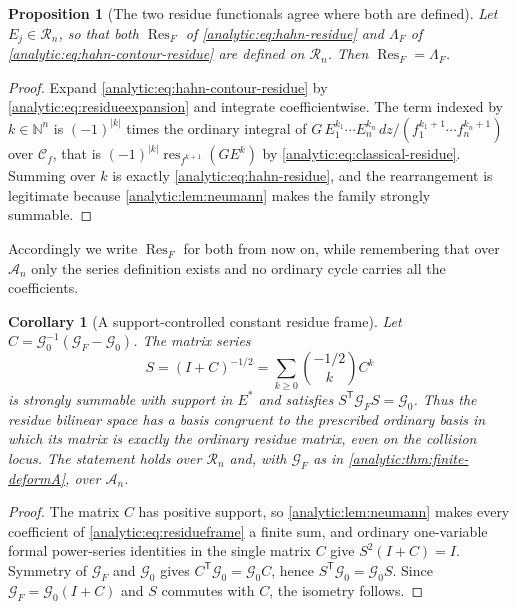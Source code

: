 \documentclass[11pt,letterpaper]{article}
\newtheorem{proposition}[theorem]{Proposition}
\newtheorem{corollary}[theorem]{Corollary}
\theoremstyle{definition}
\theoremstyle{remark}
\newcommand{\N}{\mathbb N}
\newcommand{\A}{\mathscr A}
\newcommand{\RR}{\mathscr R}
\newcommand{\Res}{\operatorname{Res}}
\newcommand{\res}{\operatorname{res}}
\numberwithin{equation}{section}
\begin{document}
\begin{proposition}[The two residue functionals agree where both are
defined]\label{analytic:prop:residues-agree}
Let $E_j\in\RR_n$, so that both $\Res_F$ of
\eqref{analytic:eq:hahn-residue} and $\Lambda_F$ of
\eqref{analytic:eq:hahn-contour-residue} are defined on $\RR_n$. Then
$\Res_F=\Lambda_F$.
\end{proposition}
\begin{proof}
Expand \eqref{analytic:eq:hahn-contour-residue} by
\eqref{analytic:eq:residueexpansion} and integrate coefficientwise. The
term indexed by $k\in\N^n$ is
$(-1)^{|k|}$ times the ordinary integral of
$G\,E_1^{k_1}\cdots E_n^{k_n}\,dz/(f_1^{k_1+1}\cdots f_n^{k_n+1})$ over
$\mathcal C_f$, that is $(-1)^{|k|}\res_{f^{k+1}}(GE^k)$ by
\eqref{analytic:eq:classical-residue}. Summing over $k$ is exactly
\eqref{analytic:eq:hahn-residue}, and the rearrangement is legitimate
because \cref{analytic:lem:neumann} makes the family strongly summable.
\end{proof}

Accordingly we write $\Res_F$ for both from now on, while remembering that
over $\A_n$ only the series definition exists and no ordinary cycle carries
all the coefficients.

\begin{corollary}[A support-controlled constant residue frame]
\label{analytic:cor:residueframe}
Let $C=\mathcal G_0^{-1}(\mathcal G_F-\mathcal G_0)$. The matrix series
\begin{equation}\label{analytic:eq:residueframe}
 S=(I+C)^{-1/2}=\sum_{k\ge0}\binom{-1/2}{k}C^k
\end{equation}
is strongly summable with support in $E^*$ and satisfies
$S^{\mathsf T}\mathcal G_FS=\mathcal G_0$. Thus the residue bilinear space
has a basis congruent to the prescribed ordinary basis in which its matrix
is exactly the ordinary residue matrix, even on the collision locus. The
statement holds over $\RR_n$ and, with $\mathcal G_F$ as in
\cref{analytic:thm:finite-deformA}, over $\A_n$.
\end{corollary}
\begin{proof}
The matrix $C$ has positive support, so \cref{analytic:lem:neumann} makes
every coefficient of \eqref{analytic:eq:residueframe} a finite sum, and
ordinary one-variable formal power-series identities in the single matrix
$C$ give $S^2(I+C)=I$. Symmetry of $\mathcal G_F$ and $\mathcal G_0$ gives
$C^{\mathsf T}\mathcal G_0=\mathcal G_0C$, hence
$S^{\mathsf T}\mathcal G_0=\mathcal G_0S$. Since
$\mathcal G_F=\mathcal G_0(I+C)$ and $S$ commutes with $C$, the isometry
follows.
\end{proof}
\end{document}
